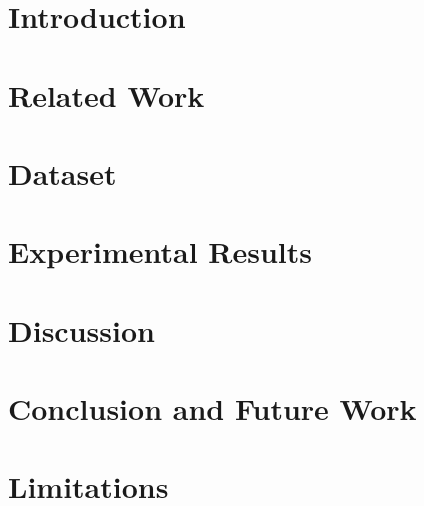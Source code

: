 \documentclass[11pt]{article}
\author{Ho Yin `Sam' Ng\textsuperscript{1}~~~~
Ting-Yao Hsu\textsuperscript{1}~~~~
Aashish Anantha Ramakrishnan\textsuperscript{1}\\
\textbf{Branislav Kveton\textsuperscript{2}~~~~
Nedim Lipka\textsuperscript{2}~~~~
Franck Dernoncourt\textsuperscript{2}~~~~
Dongwon Lee\textsuperscript{1}}\\
\textbf{Tong Yu\textsuperscript{2}~~~~
Sungchul Kim\textsuperscript{2}~~~~
Ryan A. Rossi\textsuperscript{2}~~~~
Ting-Hao `Kenneth' Huang\textsuperscript{1}}\\
  \textsuperscript{1}The Pennsylvania State University~~~~
  \textsuperscript{2}Adobe Research\\
\textsuperscript{1}\texttt{\{sam.ng,txh357,aashish,dongwon,txh710\}@psu.edu}~~~\\
\textsuperscript{2}\texttt{\{kveton,lipka,dernonco,tyu,sukim,ryrossi\}@adobe.com}\\
}
\begin{document}
\maketitle

\begin{abstract}

\end{abstract}

\section{Introduction\label{sec:intro}}


\section{Related Work\label{sec:realted-work}}


\section{\dataset Dataset\label{sec:dataset}}


\section{Experimental Results\label{sec:results}}






\section{Discussion\label{sec:discussion}}






\section{Conclusion and Future Work\label{sec:conclusion}}




\section{Limitations\label{sec:limitations}}

\end{document}
